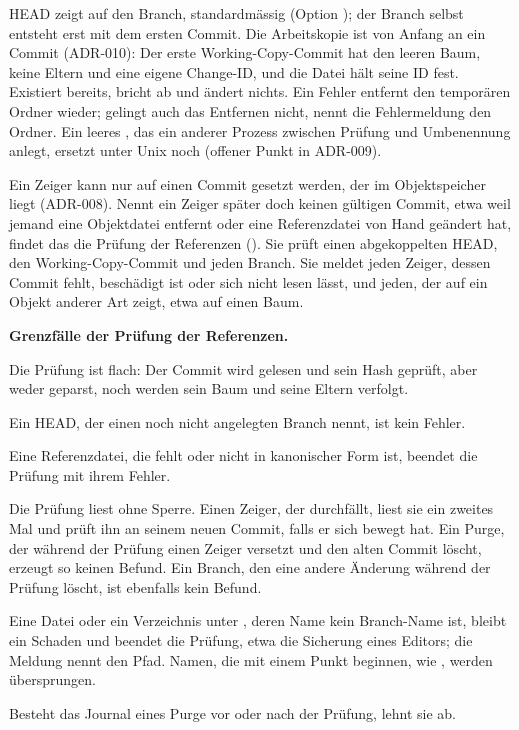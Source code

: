 HEAD zeigt auf den Branch, standardmässig  (Option );
der Branch selbst entsteht erst mit dem ersten Commit.
Die Arbeitskopie ist von Anfang an ein Commit (ADR-010):
Der erste Working-Copy-Commit hat den leeren Baum, keine Eltern und eine eigene Change-ID,
und die Datei  hält seine ID fest.
Existiert  bereits, bricht  ab und ändert nichts.
Ein Fehler entfernt den temporären Ordner wieder; gelingt auch das Entfernen nicht,
nennt die Fehlermeldung den Ordner.
Ein leeres , das ein anderer Prozess zwischen Prüfung und Umbenennung anlegt,
ersetzt  unter Unix noch (offener Punkt in ADR-009).

Ein Zeiger kann nur auf einen Commit gesetzt werden, der im Objektspeicher liegt (ADR-008).
Nennt ein Zeiger später doch keinen gültigen Commit, etwa weil jemand eine Objektdatei entfernt
oder eine Referenzdatei von Hand geändert hat, findet das die Prüfung der Referenzen
().
Sie prüft einen abgekoppelten HEAD, den Working-Copy-Commit und jeden Branch.
Sie meldet jeden Zeiger, dessen Commit fehlt, beschädigt ist oder sich nicht lesen lässt,
und jeden, der auf ein Objekt anderer Art zeigt, etwa auf einen Baum.

\startinfobox
{\bf Grenzfälle der Prüfung der Referenzen.}
\startitemize
\item Die Prüfung ist flach: Der Commit wird gelesen und sein Hash geprüft,
aber weder geparst, noch werden sein Baum und seine Eltern verfolgt.
\item Ein HEAD, der einen noch nicht angelegten Branch nennt, ist kein Fehler.
\item Eine Referenzdatei, die fehlt oder nicht in kanonischer Form ist,
beendet die Prüfung mit ihrem Fehler.
\item Die Prüfung liest ohne Sperre. Einen Zeiger, der durchfällt, liest sie ein zweites Mal
und prüft ihn an seinem neuen Commit, falls er sich bewegt hat.
Ein Purge, der während der Prüfung einen Zeiger versetzt und den alten Commit löscht,
erzeugt so keinen Befund.
Ein Branch, den eine andere Änderung während der Prüfung löscht, ist ebenfalls kein Befund.
\item Eine Datei oder ein Verzeichnis unter , deren Name kein Branch-Name ist,
bleibt ein Schaden und beendet die Prüfung, etwa die Sicherung  eines Editors;
die Meldung nennt den Pfad. Namen, die mit einem Punkt beginnen, wie ,
werden übersprungen.
\item Besteht das Journal eines Purge vor oder nach der Prüfung, lehnt sie ab.
\stopitemize
\stopinfobox


